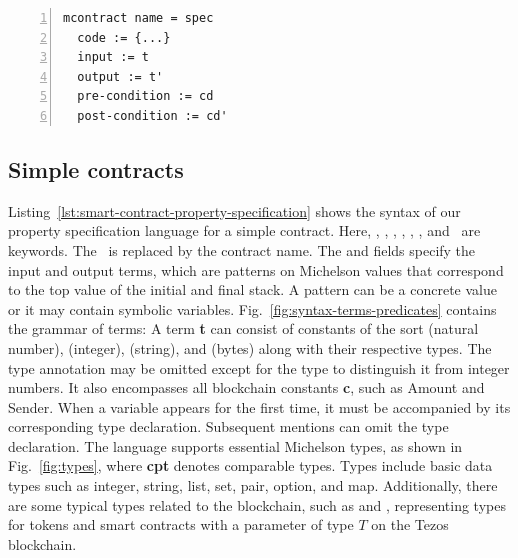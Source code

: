 \documentclass[a4paper,USenglish,cleveref, autoref,anonymous]{lipics-v2021}
\begin{document}
\begin{lstlisting}[float=tp,captionpos=b,caption={Smart contract property specification for a simple contract},label={lst:smart-contract-property-specification},numbers=left]
mcontract name = spec
  code := {...}
  input := t
  output := t'
  pre-condition := cd
  post-condition := cd'
\end{lstlisting}

\subsection{Simple contracts}
\label{sec:simple-contracts}
Listing~\ref{lst:smart-contract-property-specification} shows the
syntax of our property specification language for a simple contract. Here, \KMCONTRACT,
\KSPEC, \KCODE, \KINPUT, \KOUTPUT, \KPRECONDI, and \KPOSTCONDI\ are
keywords. The \KNAME\ is replaced by the contract name. The \KINPUT{}
and \KOUTPUT{} fields specify the input and output terms, which are
patterns on Michelson values that correspond to the top value of the
initial and final stack. A pattern can be a concrete value or it may
contain symbolic variables. Fig.~\ref{fig:syntax-terms-predicates}
contains the grammar of terms: A term \textbf{t} can consist of
constants of the sort  (natural number), 
(integer),  (string), and  (bytes) along with
their respective types. The type annotation may be omitted except for
the type  to distinguish it from integer numbers.  It also
encompasses all blockchain constants \textbf{c}, such as Amount and
Sender. When a variable appears for the first time, it must be
accompanied by its corresponding type declaration. Subsequent mentions
can omit the type declaration. The language supports essential
Michelson types, as shown in Fig.~\ref{fig:types}, where \textbf{cpt}
denotes comparable types. Types include basic data types such as
integer, string, list, set, pair, option, and map. Additionally, there
are some typical types related to the blockchain, such as 
and , representing types for tokens and smart
contracts with a parameter of type $T$ on the Tezos blockchain. 
\end{document}
